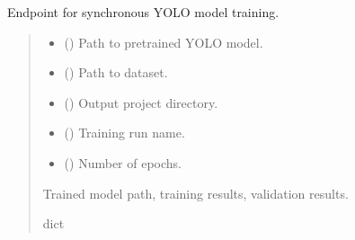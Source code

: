 \documentclass[letterpaper,10pt,english]{sphinxmanual}
\begin{document}

\begin{fulllineitems}
\label{\detokenize{modules/src.model_training.trainer:src.model_training.trainer.get_mongo_data}}
\pysigstartsignatures
\pysiglinewithargsret
{}
{\sphinxparamcomma {}\sphinxparamcomma {}\sphinxparamcomma {}\sphinxparamcomma {}}
{}
\pysigstopsignatures
\sphinxAtStartPar
Endpoint for synchronous YOLO model training.
\begin{quote}\begin{description}
\begin{itemize}
\item {} 
\sphinxAtStartPar
{} () \textendash{} Path to pretrained YOLO model.

\item {} 
\sphinxAtStartPar
{} () \textendash{} Path to dataset.

\item {} 
\sphinxAtStartPar
{} () \textendash{} Output project directory.

\item {} 
\sphinxAtStartPar
{} () \textendash{} Training run name.

\item {} 
\sphinxAtStartPar
{} (\sphinxstyleliteralemphasis{\sphinxupquote{, }}) \textendash{} Number of epochs.

\end{itemize}

\sphinxAtStartPar
Trained model path, training results, validation results.

\sphinxAtStartPar
dict

\end{description}\end{quote}

\end{fulllineitems}
\end{document}
